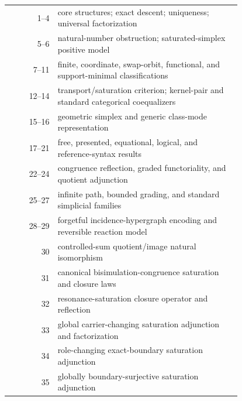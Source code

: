 \documentclass[11pt]{article}
\theoremstyle{definition}
\begin{document}
\begin{center}\scriptsize
\begin{tabular}{@{}r p{0.79\linewidth}@{}}
\toprule
1--4 & core structures; exact descent; uniqueness; universal factorization \\
5--6 & natural-number obstruction; saturated-simplex positive model \\
7--11 & finite, coordinate, swap-orbit, functional, and support-minimal classifications \\
12--14 & transport/saturation criterion; kernel-pair and standard categorical coequalizers \\
15--16 & geometric simplex and generic class-mode representation \\
17--21 & free, presented, equational, logical, and reference-syntax results \\
22--24 & congruence reflection, graded functoriality, and quotient adjunction \\
25--27 & infinite path, bounded grading, and standard simplicial families \\
28--29 & forgetful incidence-hypergraph encoding and reversible reaction model \\
30 & controlled-sum quotient/image natural isomorphism \\
31 & canonical bisimulation-congruence saturation and closure laws \\
32 & resonance-saturation closure operator and reflection \\
33 & global carrier-changing saturation adjunction and factorization \\
34 & role-changing exact-boundary saturation adjunction \\
35 & globally boundary-surjective saturation adjunction \\
\bottomrule
\end{tabular}
\end{center}
\end{document}
